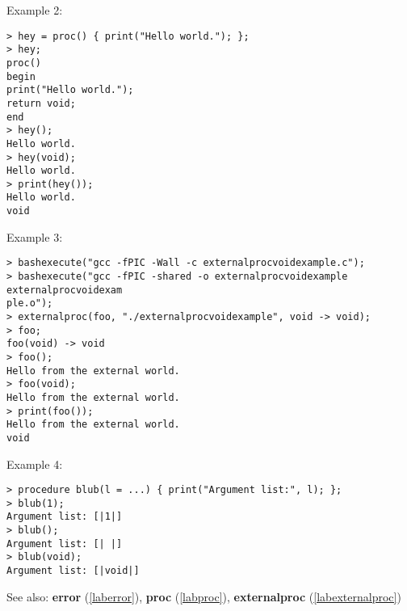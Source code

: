 \noindent Example 2: 
\begin{center}\begin{minipage}{15cm}\begin{Verbatim}[frame=single]
> hey = proc() { print("Hello world."); };
> hey;
proc()
begin
print("Hello world.");
return void;
end
> hey();
Hello world.
> hey(void);
Hello world.
> print(hey());
Hello world.
void
\end{Verbatim}
\end{minipage}\end{center}
\noindent Example 3: 
\begin{center}\begin{minipage}{15cm}\begin{Verbatim}[frame=single]
> bashexecute("gcc -fPIC -Wall -c externalprocvoidexample.c");
> bashexecute("gcc -fPIC -shared -o externalprocvoidexample externalprocvoidexam
ple.o");
> externalproc(foo, "./externalprocvoidexample", void -> void);
> foo;
foo(void) -> void
> foo();
Hello from the external world.
> foo(void);
Hello from the external world.
> print(foo());
Hello from the external world.
void
\end{Verbatim}
\end{minipage}\end{center}
\noindent Example 4: 
\begin{center}\begin{minipage}{15cm}\begin{Verbatim}[frame=single]
> procedure blub(l = ...) { print("Argument list:", l); };
> blub(1);
Argument list: [|1|]
> blub();
Argument list: [| |]
> blub(void); 
Argument list: [|void|]
\end{Verbatim}
\end{minipage}\end{center}
See also: \textbf{error} (\ref{laberror}), \textbf{proc} (\ref{labproc}), \textbf{externalproc} (\ref{labexternalproc})
